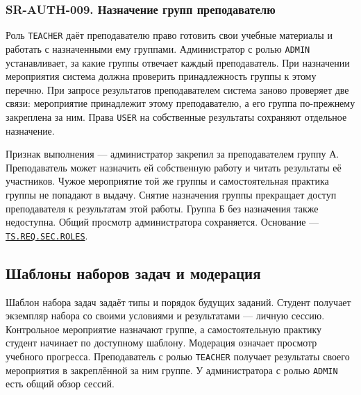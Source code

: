 \documentclass[12pt,a4paper]{article}
\begin{document}
\subsubsection{SR-AUTH-009. Назначение групп преподавателю}\label{sr-auth-009-ux43dux430ux437ux43dux430ux447ux435ux43dux438ux435-ux433ux440ux443ux43fux43f-ux43fux440ux435ux43fux43eux434ux430ux432ux430ux442ux435ux43bux44e}

\hypertarget{sr-auth-009-назначение-групп-преподавателю}{}

\hypertarget{sr-auth-009}{}

Роль \texttt{TEACHER} даёт преподавателю право готовить свои учебные материалы и работать с назначенными ему группами. Администратор с ролью \texttt{ADMIN} устанавливает, за какие группы отвечает каждый преподаватель. При назначении мероприятия система должна проверить принадлежность группы к этому перечню. При запросе результатов преподавателем система заново проверяет две связи: мероприятие принадлежит этому преподавателю, а его группа по-прежнему закреплена за ним. Права \texttt{USER} на собственные результаты сохраняют отдельное назначение.

Признак выполнения --- администратор закрепил за преподавателем группу А. Преподаватель может назначить ей собственную работу и читать результаты её участников. Чужое мероприятие той же группы и самостоятельная практика группы не попадают в выдачу. Снятие назначения группы прекращает доступ преподавателя к результатам этой работы. Группа Б без назначения также недоступна. Общий просмотр администратора сохраняется. Основание --- {\href{../02\_Техническое\_задание/Техническое\_задание.pdf\#ts-req-sec-roles}{\texttt{TS.\allowbreak{}REQ.\allowbreak{}SEC.\allowbreak{}ROLES}}}.

\subsection{Шаблоны наборов задач и модерация}\label{ux448ux430ux431ux43bux43eux43dux44b-ux43dux430ux431ux43eux440ux43eux432-ux437ux430ux434ux430ux447-ux438-ux43cux43eux434ux435ux440ux430ux446ux438ux44f}

\hypertarget{шаблоны-наборов-задач-и-модерация}{}

Шаблон набора задач задаёт типы и порядок будущих заданий. Студент получает экземпляр набора со своими условиями и результатами --- личную сессию. Контрольное мероприятие назначают группе, а самостоятельную практику студент начинает по доступному шаблону. Модерация означает просмотр учебного прогресса. Преподаватель с ролью \texttt{TEACHER} получает результаты своего мероприятия в закреплённой за ним группе. У администратора с ролью \texttt{ADMIN} есть общий обзор сессий.
\end{document}
